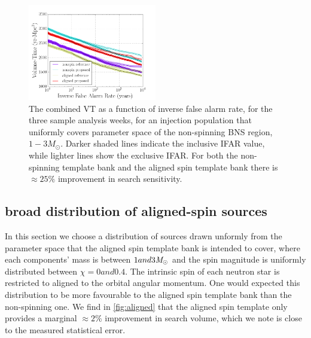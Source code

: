 \begin{figure}
\centering
\includegraphics[width=0.5\textwidth]{papers/bns_o1_dev/figures/ns_combined.png}
\caption{\label{fig:nonspin} 
The combined VT as a function of inverse false alarm rate, for the
three sample analysis weeks, for an injection population that uniformly covers parameter space of the non-spinning BNS region, $1- 3M_\odot$. Darker shaded lines indicate the inclusive IFAR value, while lighter lines show the exclusive IFAR. For both the non-spinning template bank and the aligned spin template bank there is $\approx 25 \%$ improvement in search sensitivity.
}
\end{figure}

\subsection{broad distribution of aligned-spin sources}
\label{sec:baligned}

In this section we choose a distribution of sources drawn unformly from the parameter space that the aligned spin template bank is intended to cover, where each components' mass is between $1 and 3 \mathit{M}_\odot$ and the spin magnitude is uniformly distributed between $\chi=0 and 0.4$. The intrinsic spin of each neutron star is restricted to aligned to the orbital angular momentum. One would expected this distribution to be more favourable to the aligned spin template bank than the non-spinning one. We find in \ref{fig:aligned} that the aligned spin template only provides a marginal $\approx 2\%$ improvement in search volume, which we note is close to the measured statistical error. 

